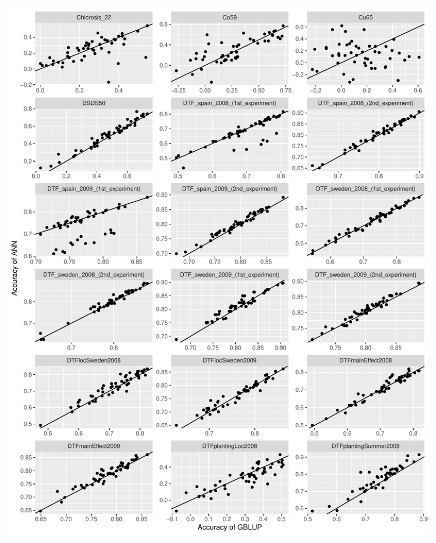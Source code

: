 \begin{figure}[H]
  \centering \includegraphics[height=0.99\textheight, width=0.99\textwidth]{Figures/cor_plots_2}
  \decoRule
 \label{fig:bla}
\end{figure}

